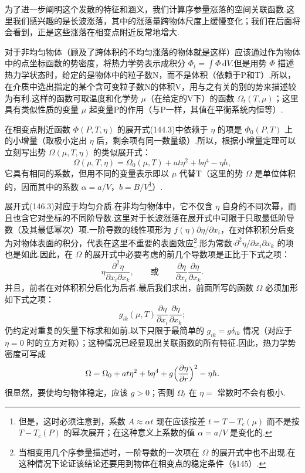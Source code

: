 为了进一步阐明这个发散的特征和涵义，我们计算序参量涨落的空间关联函数.这里我们感兴趣的是长波涨落，其中的涨落量跨物体尺度上缓慢变化；我们在后面将会看到，正是这些涨落在相变点附近反常地增大.

对于非均匀物体（顾及了跨体积的不均匀涨落的物体就是这样）应该通过作为物体中的点坐标函数的势密度，将热力学势表示成积分 $\Phi_t=\int\Phi\,\mathrm{d}V$.但是用势 $\Phi$ 描述热力学状态时，给定的是物体中的粒子数N，而不是体积（依赖于P和T）.所以，在介质中选出指定的某个含可变粒子数N的体积V，用与之有关的别的势来描述较为有利.这样的函数可取温度和化学势 $\mu$（在给定的V下）的函数 $\Omega_t(T,\mu)$；这里具有类似性质的变量 $\mu$ 起变量P的作用（与P一样，其值在平衡系统内恒等）.

在相变点附近函数 $\Phi(P,T,\eta)$ 的展开式(144.3)中依赖于 $\eta$ 的项是 $\Phi_0(P,T)$ 上的小增量（取极小定出 $\eta$ 后，剩余项有同一数量级）.所以，根据小增量定理可以立刻写出势 $\Omega(\mu,T,\eta)$ 的类似展开式：
\begin{equation}
  \Omega(\mu,T,\eta)=\Omega_0(\mu,T)+at\eta^2+b\eta^4-\eta h,
\end{equation}
它具有相同的系数，但用不同的变量表示即以 $\mu$ 代替T（这里的势 $\Omega$ 是单位体积的，因而其中的系数 $\alpha=a/V$，$b=B/V$\footnote{但是，这时必须注意到，系数 $A\approx\alpha t$ 现在应该按差 $t=T-T_c(\mu)$ 而不是按 $T-T_c(P)$ 的幂次展开；在这种意义上系数的值 $\alpha=a/V$ 是变化的.}）.

展开式(146.3)对应于均匀介质.在非均匀物体中，它不仅含 $\eta$ 自身的不同次幂，而且也含它对坐标的不同阶导数.这里对于长波涨落在展开式中可限于只取最低阶导数（及其最低幂次）项.一阶导数的线性项形为 $f(\eta)\partial\eta/\partial x_i$，在对体积积分后变为对物体表面的积分，代表在这里不重要的表面效应\footnote{当相变用几个序参量描述时，一阶导数的一次项在 $\Omega$ 的展开式中也不出现.在这种情况下论证该结论还要用到物体在相变点的稳定条件（§145）.}.形为常数$\cdot\partial^2\eta/\partial x_i\partial x_k$ 的项也是如此.因此，在 $\Omega$ 的展开式中必要考虑的前几个导数项是正比于下式之项：
\begin{equation*}
  \eta\frac{\partial^2\eta}{\partial x_i\partial x_k},
  \qquad\text{或}\qquad
  \frac{\partial\eta}{\partial x_i}\frac{\partial\eta}{\partial x_k}.
\end{equation*}
并且，前者在对体积积分后化为后者.最后我们求出，前面所写的函数 $\Omega$ 必须加形如下式之项：
\begin{equation}
  g_{ik}(\mu,T)\frac{\partial\eta}{\partial x_i}
  \frac{\partial\eta}{\partial x_k};
\end{equation}
仍约定对重复的矢量下标求和如前.以下只限于最简单的 $g_{ik}=g\delta_{ik}$ 情况（对应于 $\eta=0$ 时的立方对称）；这种情况已经显现出关联函数的所有特征.因此，热力学势密度可写成
\begin{equation}
  \Omega=\Omega_0+at\eta^2+b\eta^4+g\Bigl(\frac{\partial\eta}{\partial r}\Bigr)^2-\eta h.
\end{equation}
很显然，要使均匀物体稳定，应该 $g>0$；否则 $\Omega_t$ 在 $\eta=$ 常数时不会有极小.

